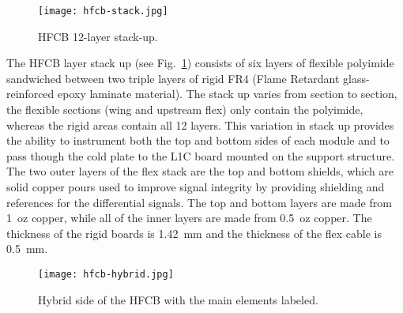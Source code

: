 \begin{figure}[h] 
\centering 
\texttt{[image: hfcb-stack.jpg]}
\caption{HFCB 12-layer stack-up.}
\label{fig:hfcb-stack}
\end{figure}

The HFCB layer stack up (see Fig.~\ref{fig:hfcb-stack}) consists of six layers of flexible polyimide sandwiched
between two triple layers of rigid FR4 (Flame Retardant glass-reinforced epoxy laminate material). The stack up
varies from section to section, the flexible sections (wing and upstream flex) only contain the polyimide, whereas
the rigid areas contain all 12 layers. This variation in stack up provides the ability to instrument both the top and
bottom sides of each module and to pass though the cold plate to the L1C board mounted on the support structure.
The two outer layers of the flex stack are the top and bottom shields, which are solid copper pours used to improve
signal integrity by providing shielding and references for the differential signals. The top and bottom layers are
made from 1~oz copper, while all of the inner layers are made from 0.5~oz copper. The thickness of the rigid boards
is 1.42~mm and the thickness of the flex cable is 0.5~mm.

\begin{figure}[h] 
\centering 
\texttt{[image: hfcb-hybrid.jpg]}
\caption{Hybrid side of the HFCB with the main elements labeled.}
\label{fig:hfcb-hybrid}
\end{figure}

